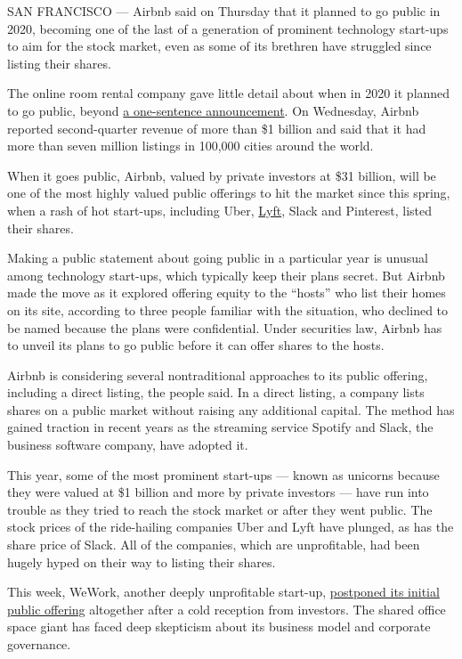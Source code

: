 SAN FRANCISCO --- Airbnb said on Thursday that it planned to go public
in 2020, becoming one of the last of a generation of prominent
technology start-ups to aim for the stock market, even as some of its
brethren have struggled since listing their shares.

The online room rental company gave little detail about when in 2020 it
planned to go public, beyond
\href{https://press.airbnb.com/airbnb-announces-intention-to-become-a-publicly-traded-company-during-2020/}{a
one-sentence announcement}. On Wednesday, Airbnb reported second-quarter
revenue of more than \$1 billion and said that it had more than seven
million listings in 100,000 cities around the world.

When it goes public, Airbnb, valued by private investors at \$31
billion, will be one of the most highly valued public offerings to hit
the market since this spring, when a rash of hot start-ups, including
Uber,
\href{https://www.nytimes3xbfgragh.onion/2019/03/29/technology/lyft-stock-price.html}{Lyft},
Slack and Pinterest, listed their shares.

Making a public statement about going public in a particular year is
unusual among technology start-ups, which typically keep their plans
secret. But Airbnb made the move as it explored offering equity to the
``hosts'' who list their homes on its site, according to three people
familiar with the situation, who declined to be named because the plans
were confidential. Under securities law, Airbnb has to unveil its plans
to go public before it can offer shares to the hosts.

Airbnb is considering several nontraditional approaches to its public
offering, including a direct listing, the people said. In a direct
listing, a company lists shares on a public market without raising any
additional capital. The method has gained traction in recent years as
the streaming service Spotify and Slack, the business software company,
have adopted it.

This year, some of the most prominent start-ups --- known as unicorns
because they were valued at \$1 billion and more by private investors
--- have run into trouble as they tried to reach the stock market or
after they went public. The stock prices of the ride-hailing companies
Uber and Lyft have plunged, as has the share price of Slack. All of the
companies, which are unprofitable, had been hugely hyped on their way to
listing their shares.

This week, WeWork, another deeply unprofitable start-up,
\href{https://www.nytimes3xbfgragh.onion/2019/09/17/business/dealbook/wework-ipo.html}{postponed
its initial public offering} altogether after a cold reception from
investors. The shared office space giant has faced deep skepticism about
its business model and corporate governance.


